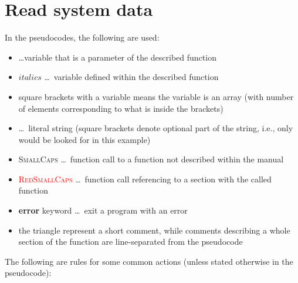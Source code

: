 \section{Read system data} \label{sec:ReadSystemData}

In the pseudocodes, the following are used:
\begin{itemize}
  \item {} \ldots variable that is a parameter of the described
    function
  \item $italics$ \ldots \ variable defined within the described function
  \item square brackets with a variable means the variable is an array (with
    number of elements corresponding to what is inside the brackets)
  \item {} \ldots \ literal string (square brackets denote
    optional part of the string, i.e., only  would be looked for in
    this example)
  \item \textsc{SmallCaps} \ldots \ function call to a function not described
    within the manual
  \item \textsc{\textcolor{red}{RedSmallCaps}} \ldots \ function call
    referencing to a section with the called function
  \item \textbf{error} keyword \ldots \ exit a program with an error
  \item the triangle represent a short comment, while comments describing a
    whole section of the function are line-separated from the pseudocode
\end{itemize}
The following are rules for some common actions (unless stated otherwise in the
pseudocode):
